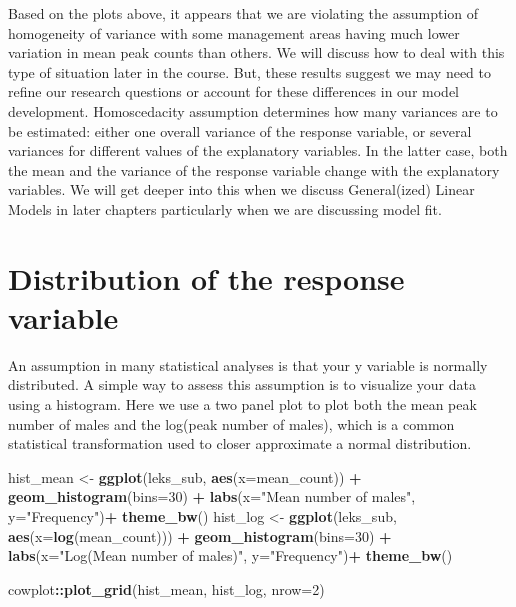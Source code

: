 \documentclass[
]{book}
\newenvironment{Shaded}{\begin{snugshade}}{\end{snugshade}}
\newcommand{\AttributeTok}[1]{\textcolor[rgb]{0.13,0.29,0.53}{#1}}
\newcommand{\DecValTok}[1]{\textcolor[rgb]{0.00,0.00,0.81}{#1}}
\newcommand{\FunctionTok}[1]{\textcolor[rgb]{0.13,0.29,0.53}{\textbf{#1}}}
\newcommand{\NormalTok}[1]{#1}
\newcommand{\OtherTok}[1]{\textcolor[rgb]{0.56,0.35,0.01}{#1}}
\newcommand{\SpecialCharTok}[1]{\textcolor[rgb]{0.81,0.36,0.00}{\textbf{#1}}}
\newcommand{\StringTok}[1]{\textcolor[rgb]{0.31,0.60,0.02}{#1}}
\begin{document}
Based on the plots above, it appears that we are violating the assumption of homogeneity of variance with some management areas having much lower variation in mean peak counts than others. We will discuss how to deal with this type of situation later in the course. But, these results suggest we may need to refine our research questions or account for these differences in our model development. Homoscedacity assumption determines how many variances are to be estimated: either one overall variance of the response variable, or several variances for different values of the explanatory variables. In the latter case, both the mean and the variance of the response variable change with the explanatory variables. We will get deeper into this when we discuss General(ized) Linear Models in later chapters particularly when we are discussing model fit.

\hypertarget{distribution-of-the-response-variable}{%
\section{Distribution of the response variable}\label{distribution-of-the-response-variable}}

An assumption in many statistical analyses is that your y variable is normally distributed. A simple way to assess this assumption is to visualize your data using a histogram. Here we use a two panel plot to plot both the mean peak number of males and the log(peak number of males), which is a common statistical transformation used to closer approximate a normal distribution.

\begin{Shaded}
\begin{Highlighting}[]
\NormalTok{hist\_mean }\OtherTok{\textless{}{-}} \FunctionTok{ggplot}\NormalTok{(leks\_sub, }\FunctionTok{aes}\NormalTok{(}\AttributeTok{x=}\NormalTok{mean\_count)) }\SpecialCharTok{+}                 
                \FunctionTok{geom\_histogram}\NormalTok{(}\AttributeTok{bins=}\DecValTok{30}\NormalTok{) }\SpecialCharTok{+}                 
                \FunctionTok{labs}\NormalTok{(}\AttributeTok{x=}\StringTok{"Mean number of males"}\NormalTok{, }\AttributeTok{y=}\StringTok{"Frequency"}\NormalTok{)}\SpecialCharTok{+}                 
                \FunctionTok{theme\_bw}\NormalTok{()}
\NormalTok{hist\_log }\OtherTok{\textless{}{-}} \FunctionTok{ggplot}\NormalTok{(leks\_sub, }\FunctionTok{aes}\NormalTok{(}\AttributeTok{x=}\FunctionTok{log}\NormalTok{(mean\_count))) }\SpecialCharTok{+}   
                \FunctionTok{geom\_histogram}\NormalTok{(}\AttributeTok{bins=}\DecValTok{30}\NormalTok{) }\SpecialCharTok{+}   
                \FunctionTok{labs}\NormalTok{(}\AttributeTok{x=}\StringTok{"Log(Mean number of males)"}\NormalTok{, }\AttributeTok{y=}\StringTok{"Frequency"}\NormalTok{)}\SpecialCharTok{+}   
                \FunctionTok{theme\_bw}\NormalTok{()                            }

\NormalTok{cowplot}\SpecialCharTok{::}\FunctionTok{plot\_grid}\NormalTok{(hist\_mean, hist\_log, }\AttributeTok{nrow=}\DecValTok{2}\NormalTok{)}
\end{Highlighting}
\end{Shaded}
\end{document}

